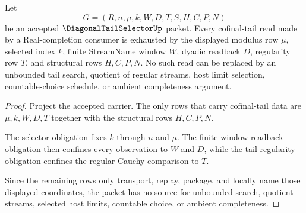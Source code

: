 \begin{theorem}
\label{thm:diagonal-tail-selector-cofinal-window-exhaustion}
Let
$$
G=(R,n,\mu,k,W,D,T,S,H,C,P,N)
$$
be an accepted $\DiagonalTailSelectorUp$ packet. Every cofinal-tail read made by a Real-completion consumer is exhausted by the displayed modulus row $\mu$, selected index $k$, finite StreamName window $W$, dyadic readback $D$, regularity row $T$, and structural rows $H,C,P,N$. No such read can be replaced by an unbounded tail search, quotient of regular streams, host limit selection, countable-choice schedule, or ambient completeness argument.
\end{theorem}
\begin{proof}
Project the accepted carrier. The only rows that carry cofinal-tail data are $\mu,k,W,D,T$ together with the structural rows $H,C,P,N$.

The selector obligation fixes $k$ through $n$ and $\mu$. The finite-window readback obligation then confines every observation to $W$ and $D$, while the tail-regularity obligation confines the regular-Cauchy comparison to $T$.

Since the remaining rows only transport, replay, package, and locally name those displayed coordinates, the packet has no source for unbounded search, quotient streams, selected host limits, countable choice, or ambient completeness.
\end{proof}

